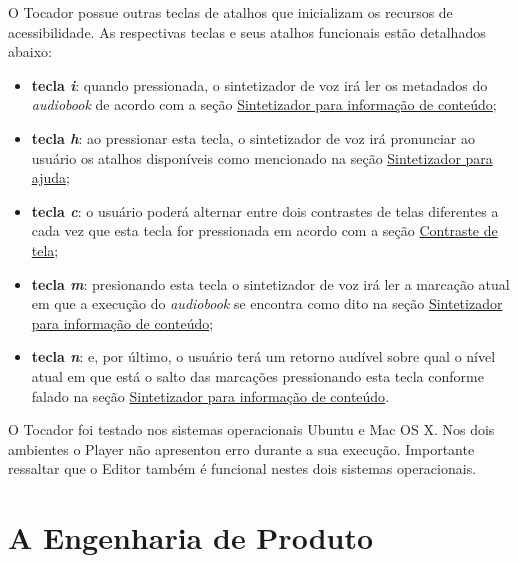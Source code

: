 O Tocador possue outras teclas de atalhos que inicializam os recursos de acessibilidade. As respectivas teclas e seus atalhos funcionais estão detalhados abaixo:

\begin{itemize}
	\item{\textbf{tecla \textit{i}}:} quando pressionada, o sintetizador de voz irá ler os metadados do \textit{audiobook} de acordo com a seção \hyperref[ttscontent]{Sintetizador para informação de conteúdo};
	\item{\textbf{tecla \textit{h}}:} ao pressionar esta tecla, o sintetizador de voz irá pronunciar ao usuário os atalhos disponíveis como mencionado na seção \hyperref[ttshelp]{Sintetizador para ajuda};
	\item{\textbf{tecla \textit{c}}:} o usuário poderá alternar entre dois contrastes de telas diferentes a cada vez que esta tecla for pressionada em acordo com a seção \hyperref[ttscontraste]{Contraste de tela};
	\item{\textbf{tecla \textit{m}}:} presionando esta tecla o sintetizador de voz irá ler a marcação atual em que a execução do \textit{audiobook} se encontra como dito na seção \hyperref[ttscontent]{Sintetizador para informação de conteúdo};
	\item{\textbf{tecla \textit{n}}:} e, por último, o usuário terá um retorno audível sobre qual o nível atual em que está o salto das marcações pressionando esta tecla conforme falado na seção \hyperref[ttscontent]{Sintetizador para informação de conteúdo}.
\end{itemize}

O Tocador foi testado nos sistemas operacionais Ubuntu e Mac OS X. Nos dois ambientes o Player não apresentou erro durante a sua execução. Importante ressaltar que o Editor também é funcional nestes dois sistemas operacionais.

\section{A Engenharia de Produto}




